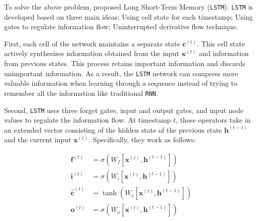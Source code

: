 To solve the above problem, \cite{hochreiter1997long} proposed Long Short-Term Memory (\verb|LSTM|). \verb|LSTM| is developed based on three main ideas: Using cell state for each timestamp; Using gates to regulate information flow; Uninterrupted derivative flow technique.


First, each cell of the network maintains a separate state $\mathbf{c}^{(t)}$. This cell state actively synthesizes information obtained from the input $\mathbf{x}^{(t)}$ and information from previous states. This process retains important information and discards unimportant information. As a result, the \verb|LSTM| network can compress more valuable information when learning through a sequence instead of trying to remember all the information like traditional \verb|RNN|.


Second, \verb|LSTM| uses three forget gates, input and output gates, and input node values to regulate the information flow. At timestamp $t$, these operators take in an extended vector consisting of the hidden state of the previous state $\mathbf{h}^{(t-1)}$ and the current input $\mathbf{x}^{(t)}$. Specifically, they work as follows:

\begin{align}
    \mathbf{f}^{(t)} &= \sigma\left(W_f \left[ \mathbf{x}^{(t)}, \mathbf{h}^{(t-1)} \right]\right)\\
    \mathbf{i}^{(t)} &= \sigma\left(W_i \left[ \mathbf{x}^{(t)}, \mathbf{h}^{(t-1)} \right]\right)\\
    \hat{\mathbf{c}}^{(t)} &= \tanh\left(W_c \left[ \mathbf{x}^{(t)}, \mathbf{h}^{(t-1)} \right]\right)\\
    \mathbf{o}^{(t)} &= \sigma\left(W_o \left[ \mathbf{x}^{(t)}, \mathbf{h}^{(t-1)} \right]\right)
\end{align}

